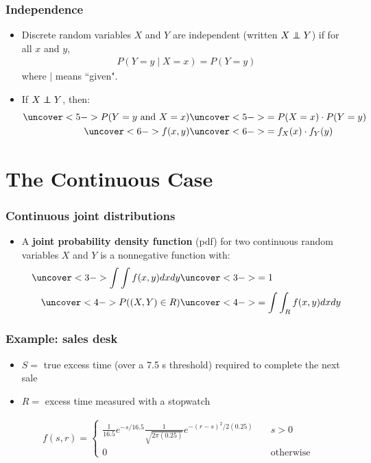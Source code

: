 \documentclass[handout]{beamer}\usepackage[]{graphicx}\usepackage[]{color}
\newcommand\ind{\protect\mathpalette{\protect\independenT}{\perp}}
\def\independenT#1#2{\mathrel{\rlap{$#1#2$}\mkern2mu{#1#2}}}
\numberwithin{equation}{section}
\begin{document}
\begin{frame}
\frametitle{Independence}
\begin{itemize}
\pause \item Discrete random variables $X$ and $Y$ are independent (written $X \ind Y$) if for all $x$ and $y$,
\pause \begin{align*}
P(Y = y \mid X = x) = P(Y = y) 
\end{align*}
where $\mid$ means ``given".
\pause \item If $X \ind Y$, then:
\begin{align*}
\uncover<5->{P(Y = y \text{ and } X = x)} & \uncover<5->{= P(X = x) \cdot P(Y = y)} \\
\uncover<6->{f(x, y)} & \uncover<6->{= f_X(x) \cdot f_Y(y)}
\end{align*}
\end{itemize}
\end{frame}

\section{The Continuous Case}

\begin{frame}
\frametitle{Continuous joint distributions}
\begin{itemize}
\pause \item A {\bf joint probability density function} (pdf) for two continuous random variables $X$ and $Y$ is a nonnegative function with:
\begin{align*}
\uncover<3->{\int \int f(x,y) dx dy} & \uncover<3->{= 1} \\
\uncover<4->{P((X, Y) \in R)} & \uncover<4->{= \int \int_R f(x,y) dx dy}
\end{align*}
\end{itemize}
\end{frame}



\begin{frame}
\frametitle{Example: sales desk}
\begin{itemize}
\pause \item $S = $ true excess time (over a 7.5 s threshold) required to complete the next sale
\pause \item $R = $ excess time measured with a stopwatch
\end{itemize}

\pause \begin{align*}
f(s,r ) = \begin{cases}
\frac{1}{16.5} e^{-s/16.5} \frac{1}{\sqrt{2 \pi (0.25)}} e^{-(r - s)^2/2(0.25)} & \quad s > 0 \\
0 & \quad \text{otherwise}
\end{cases}
\end{align*}
\end{frame}
\end{document}
